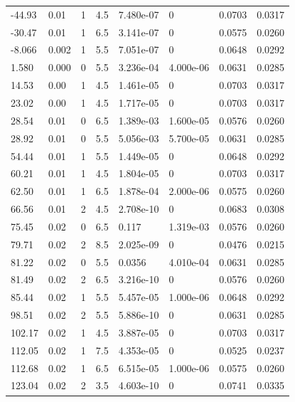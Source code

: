 \documentclass[preview]{standalone}
\begin{document}
{{\begin{tabular}{L{1.2cm}C{1.2cm} C{0.3cm}C{0.5cm} C{1.4cm}C{1.4cm} C{1.4cm}C{1.4cm}}
  -44.93  &  0.01  & 1     & 4.5 &  7.480e-07  & 0  & 0.0703 &  0.0317   \\ 
  -30.47  &  0.01  & 1     & 6.5 &  3.141e-07  & 0  & 0.0575 &  0.0260   \\ 
  -8.066  &  0.002  & 1     & 5.5 &  7.051e-07  & 0  & 0.0648 &  0.0292   \\ 
  1.580  &  0.000  & 0     & 5.5 &  3.236e-04  & 4.000e-06  & 0.0631 &  0.0285   \\ 
  14.53  &  0.00  & 1     & 4.5 &  1.461e-05  & 0  & 0.0703 &  0.0317   \\ 
  23.02  &  0.00  & 1     & 4.5 &  1.717e-05  & 0  & 0.0703 &  0.0317   \\ 
  28.54  &  0.01  & 0     & 6.5 &  1.389e-03  & 1.600e-05  & 0.0576 &  0.0260   \\ 
  28.92  &  0.01  & 0     & 5.5 &  5.056e-03  & 5.700e-05  & 0.0631 &  0.0285   \\ 
  54.44  &  0.01  & 1     & 5.5 &  1.449e-05  & 0  & 0.0648 &  0.0292   \\ 
  60.21  &  0.01  & 1     & 4.5 &  1.804e-05  & 0  & 0.0703 &  0.0317   \\ 
  62.50  &  0.01  & 1     & 6.5 &  1.878e-04  & 2.000e-06  & 0.0575 &  0.0260   \\ 
  66.56  &  0.01  & 2     & 4.5 &  2.708e-10  & 0  & 0.0683 &  0.0308   \\ 
  75.45  &  0.02  & 0     & 6.5 &  0.117  & 1.319e-03  & 0.0576 &  0.0260   \\ 
  79.71  &  0.02  & 2     & 8.5 &  2.025e-09  & 0  & 0.0476 &  0.0215   \\ 
  81.22  &  0.02  & 0     & 5.5 &  0.0356  & 4.010e-04  & 0.0631 &  0.0285   \\ 
  81.49  &  0.02  & 2     & 6.5 &  3.216e-10  & 0  & 0.0576 &  0.0260   \\ 
  85.44  &  0.02  & 1     & 5.5 &  5.457e-05  & 1.000e-06  & 0.0648 &  0.0292   \\ 
  98.51  &  0.02  & 2     & 5.5 &  5.886e-10  & 0  & 0.0631 &  0.0285   \\ 
  102.17  &  0.02  & 1     & 4.5 &  3.887e-05  & 0  & 0.0703 &  0.0317   \\ 
  112.05  &  0.02  & 1     & 7.5 &  4.353e-05  & 0  & 0.0525 &  0.0237   \\ 
  112.68  &  0.02  & 1     & 6.5 &  6.515e-05  & 1.000e-06  & 0.0575 &  0.0260   \\ 
  123.04  &  0.02  & 2     & 3.5 &  4.603e-10  & 0  & 0.0741 &  0.0335   \\ 

\end{tabular}}}
\end{document}
